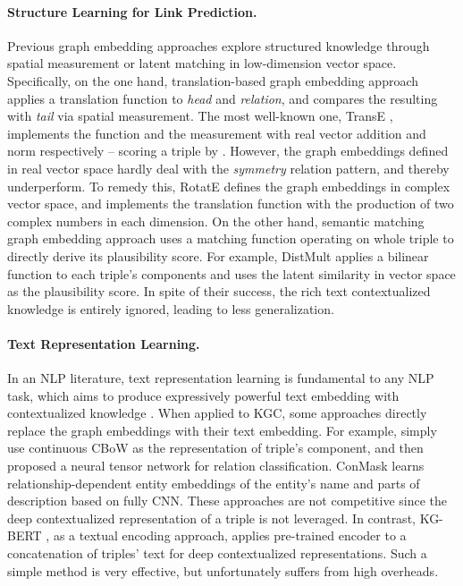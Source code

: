 \documentclass[sigconf]{acmart}
\begin{document}
\paragraph{Structure Learning for Link Prediction.}
Previous graph embedding approaches explore structured knowledge through spatial measurement or latent matching in low-dimension vector space. 
Specifically, on the one hand, translation-based graph embedding approach \cite{TransE,sun2019rotate} applies a translation function to \textit{head} and \textit{relation}, and compares the resulting with \textit{tail} via spatial measurement. 
The most well-known one, TransE \cite{TransE}, implements the function and the measurement with real vector addition and  norm respectively -- scoring a triple by . 
However, the graph embeddings defined in real vector space hardly deal with the \textit{symmetry} relation pattern, and thereby underperform. 
To remedy this, RotatE \cite{sun2019rotate} defines the graph embeddings in complex vector space, and implements the translation function with the production of two complex numbers in each dimension. 
On the other hand, semantic matching graph embedding approach \cite{yang2014DistMult,balavzevic2019tucker,QuatE} uses a matching function  operating on whole triple to directly derive its plausibility score. 
For example, DistMult \cite{yang2014DistMult} applies a bilinear function to each triple's components and uses the latent similarity in vector space as the plausibility score. 
In spite of their success, the rich text contextualized knowledge is entirely ignored, leading to less generalization. 

\paragraph{Text Representation Learning.}
In an NLP literature, text representation learning is fundamental to any NLP task, which aims to produce expressively powerful text embedding with contextualized knowledge \cite{ELMo,BERT}. 
When applied to KGC, some approaches \cite{socher2013kgc,McIlraith2018open} directly replace the graph embeddings with their text embedding. 
For example, \citet{socher2013kgc} simply use continuous CBoW as the representation of triple's component, and then proposed a neural tensor network for relation classification. 
ConMask \cite{McIlraith2018open} learns relationship-dependent entity embeddings of the entity’s name and parts of description based on fully CNN. 
These approaches are not competitive since the deep contextualized representation of a triple is not leveraged. 
In contrast, KG-BERT \cite{yao2019kgbert}, as a textual encoding approach, applies pre-trained encoder to a concatenation of triples' text for deep contextualized representations. Such a simple method is very effective, but unfortunately suffers from high overheads. 
\end{document}
